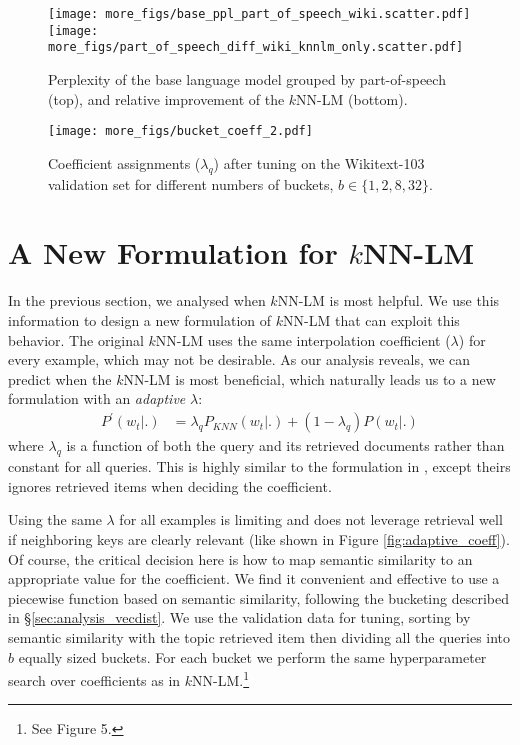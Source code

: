 \documentclass[11pt]{article}
\begin{document}
\begin{figure}[!t]
\centering
\texttt{[image: more\_figs/base\_ppl\_part\_of\_speech\_wiki.scatter.pdf]}
\texttt{[image: more\_figs/part\_of\_speech\_diff\_wiki\_knnlm\_only.scatter.pdf]}
\caption{Perplexity of the base language model grouped by part-of-speech (top), and relative improvement of the $k$NN-LM (bottom).}
\label{fig:analysis_pos_wiki_knnlm}
\end{figure}

\begin{figure}[!ht]
\centering
\texttt{[image: more\_figs/bucket\_coeff\_2.pdf]}
\caption{Coefficient assignments ($\lambda_q$) after tuning on the Wikitext-103 validation set for different numbers of buckets, $b \in \{1, 2, 8, 32\}$.}
\label{fig:bucket_coeff}
\end{figure}


\section{A New Formulation for $k$NN-LM}

\label{sec:adaptive_coeff}

In the previous section, we analysed when $k$NN-LM is most helpful. We use this information to design a new formulation of $k$NN-LM that can exploit this behavior. The original $k$NN-LM uses the same interpolation coefficient ($\lambda$) for every example, which may not be desirable. As our analysis reveals, we can predict when the $k$NN-LM is most beneficial, which naturally leads us to a new formulation with an \emph{adaptive} $\lambda$:
\begin{align*} P^{'}(w_t | .) &= \lambda_q P_{KNN}(w_t | .) + (1-\lambda_q) P(w_t | . )
\end{align*}
where $\lambda_q$ is a function of both the query and its retrieved documents rather than constant for all queries. This is highly similar to the formulation in \citet{He2021EfficientNN}, except theirs ignores retrieved items when deciding the coefficient.

Using the same $\lambda$ for all examples is limiting and does not leverage retrieval well if neighboring keys are clearly relevant (like shown in Figure \ref{fig:adaptive_coeff}). Of course, the critical decision here is how to map semantic similarity to an appropriate value for the coefficient.
We find it convenient and effective to use a piecewise function based on semantic similarity, following the bucketing described in \S\ref{sec:analysis_vecdist}.
We use the validation data for tuning, sorting by semantic similarity with the topic retrieved item then dividing all the queries into $b$ equally sized buckets. For each bucket we perform the same hyperparameter search over coefficients as in $k$NN-LM.\footnote{See \citealt{khandelwal20generalization} Figure 5.} 
\end{document}
